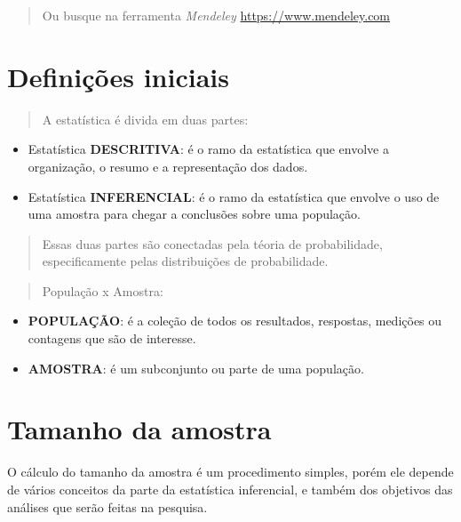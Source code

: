 \documentclass[
]{book}
\begin{document}
\begin{quote}
Ou busque na ferramenta \emph{Mendeley} \url{https://www.mendeley.com}
\end{quote}

\hypertarget{definiuxe7uxf5es-iniciais}{%
\chapter{Definições iniciais}\label{definiuxe7uxf5es-iniciais}}

\begin{quote}
A estatística é divida em duas partes:
\end{quote}

\begin{itemize}
\item
  Estatística \textbf{DESCRITIVA}: é o ramo da estatística que envolve a organização, o
  resumo e a representação dos dados.
\item
  Estatística \textbf{INFERENCIAL}: é o ramo da estatística que envolve o uso de uma amostra para chegar a conclusões sobre uma população.
\end{itemize}

\begin{quote}
Essas duas partes são conectadas pela téoria de probabilidade, especificamente pelas distribuições de probabilidade.
\end{quote}

\begin{quote}
População x Amostra:
\end{quote}

\begin{itemize}
\item
  \textbf{POPULAÇÃO}: é a coleção de todos os resultados, respostas, medições ou contagens que são de interesse.
\item
  \textbf{AMOSTRA}: é um subconjunto ou parte de uma população.
\end{itemize}

\hypertarget{tamanho-da-amostra}{%
\chapter{Tamanho da amostra}\label{tamanho-da-amostra}}

O cálculo do tamanho da amostra é um procedimento simples, porém ele depende de vários conceitos da parte da estatística inferencial, e também dos objetivos das análises que serão feitas na pesquisa.
\end{document}
